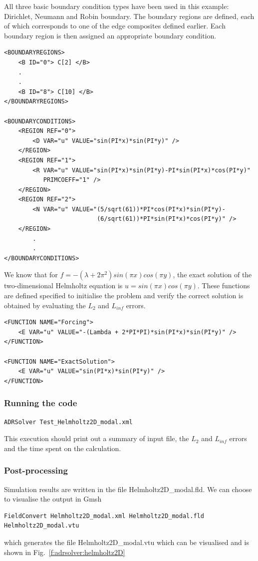 All three basic boundary condition types have been used in this example:
Dirichlet, Neumann and Robin boundary. The boundary regions are defined, each of
which corresponds to one of the edge composites defined earlier. Each boundary
region is then assigned an appropriate boundary condition.
\begin{lstlisting}[style=XMLStyle]
<BOUNDARYREGIONS>
    <B ID="0"> C[2] </B>
    .
    .
    <B ID="8"> C[10] </B>
</BOUNDARYREGIONS>

<BOUNDARYCONDITIONS>
    <REGION REF="0">
        <D VAR="u" VALUE="sin(PI*x)*sin(PI*y)" />
    </REGION>
    <REGION REF="1">
        <R VAR="u" VALUE="sin(PI*x)*sin(PI*y)-PI*sin(PI*x)*cos(PI*y)" 
           PRIMCOEFF="1" />
    </REGION>
    <REGION REF="2">
        <N VAR="u" VALUE="(5/sqrt(61))*PI*cos(PI*x)*sin(PI*y)-
                          (6/sqrt(61))*PI*sin(PI*x)*cos(PI*y)" />
    </REGION>
        .
        .
</BOUNDARYCONDITIONS>
\end{lstlisting}

We know that for $f = -(\lambda + 2 \pi^2)sin(\pi x)cos(\pi y)$, the exact 
solution of the two-dimensional Helmholtz equation is $u = sin(\pi x)cos(\pi
y)$. These functions are defined specified to initialise the problem and verify
the correct solution is obtained by evaluating the $L_2$ and $L_{inf}$ errors.
\begin{lstlisting}[style=XMLStyle]
<FUNCTION NAME="Forcing">
    <E VAR="u" VALUE="-(Lambda + 2*PI*PI)*sin(PI*x)*sin(PI*y)" />
</FUNCTION>

<FUNCTION NAME="ExactSolution">
    <E VAR="u" VALUE="sin(PI*x)*sin(PI*y)" />
</FUNCTION>
\end{lstlisting}


\subsubsection{Running the code}
\begin{lstlisting}[style=BashInputStyle]
ADRSolver Test_Helmholtz2D_modal.xml
\end{lstlisting}

This execution should print out a summary of input file, the $L_2$ and 
$L_{inf}$ errors and the time spent on the calculation.

\subsubsection{Post-processing}
Simulation results are written in the file Helmholtz2D\_modal.fld. We can choose
to visualise the output in Gmsh
\begin{lstlisting}[style=BashInputStyle]
FieldConvert Helmholtz2D_modal.xml Helmholtz2D_modal.fld Helmholtz2D_modal.vtu
\end{lstlisting}
which generates the file Helmholtz2D\_modal.vtu which can be visualised and is
shown in Fig.~\ref{f:adrsolver:helmholtz2D}

